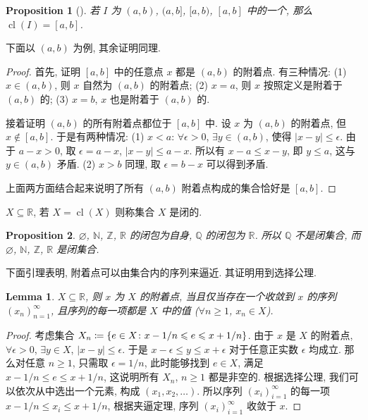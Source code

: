 \documentclass[UTF8]{ctexart}
\theoremstyle{mystyle}
\newtheorem{lemma}{Lemma}[section]
\newtheorem{proposition}{Proposition}[section]
\theoremstyle{myremark}
\theoremstyle{plain}
\newcommand{\R}{\mathbb R}
\newcommand{\Z}{\mathbb Z}
\newcommand{\N}{\mathbb N}
\newcommand{\Q}{\mathbb Q}
\DeclarePairedDelimiter\set{\{}{\}}
\DeclareMathOperator{\cl}{cl}
\begin{document}
\begin{proposition}[]
    若 $ I $ 为 $ (a, b) $, $ (a, b] $, $ [a, b) $, $ [a, b] $ 中的一个, 那么 $ \cl (I) = [a, b] $.
\end{proposition}

下面以 $ (a, b) $ 为例, 其余证明同理.
\begin{proof}
    首先, 证明 $ [a, b] $ 中的任意点 $ x $ 都是 $ (a, b) $ 的附着点. 有三种情况: (1) $ x \in (a, b) $, 则 $ x $ 自然为 $ (a, b) $ 的附着点; (2) $ x = a $, 则 $ x $ 按照定义是附着于 $ (a, b) $ 的; (3) $ x = b $, $ x $ 也是附着于 $ (a, b) $ 的.

    接着证明 $ (a, b) $ 的所有附着点都位于 $ [a, b] $ 中. 设 $ x $ 为 $ (a, b) $ 的附着点, 但 $ x \notin [a, b] $. 于是有两种情况: (1) $ x < a $: $ \forall \epsilon > 0 $, $ \exists y \in (a, b) $, 使得 $ |x - y| \leqslant \epsilon $. 由于 $ a - x > 0 $, 取 $ \epsilon = a - x $, $ |x - y| \leqslant a - x $. 所以有 $ x - a \leqslant x - y $, 即 $ y \leqslant a $, 这与 $ y \in (a, b) $ 矛盾. (2) $ x > b $ 同理, 取 $ \epsilon = b - x $ 可以得到矛盾.

    上面两方面结合起来说明了所有 $ (a, b) $ 附着点构成的集合恰好是 $ [a, b] $.
\end{proof}

\begin{definition}
    $ X \subseteq \R $, 若 $ X = \cl(X) $ 则称集合 $ X $ 是闭的.
\end{definition}

\begin{proposition}
    $ \varnothing $, $ \N $, $ \Z $, $ \R $ 的闭包为自身, $ \Q $ 的闭包为 $ \R $. 所以 $ \Q $ 不是闭集合, 而 $ \varnothing $, $ \N $, $ \Z $, $ \R $ 是闭集合.
\end{proposition}

下面引理表明, 附着点可以由集合内的序列来逼近. 其证明用到选择公理.
\begin{lemma}
    $ X \subseteq \R $, 则 $ x $ 为 $ X $ 的附着点, 当且仅当存在一个收敛到 $ x $ 的序列 $ (x_n)_{n = 1}^\infty $, 且序列的每一项都是 $ X $ 中的值 ($ \forall n \geqslant 1 $, $ x_n \in X $).
\end{lemma}

\begin{proof}
    考虑集合 $ X_n \coloneqq \set{e \in X \colon x - 1/n \leqslant e \leqslant x + 1/n} $. 由于 $ x $ 是 $ X $ 的附着点, $ \forall \epsilon > 0 $, $ \exists y \in X $, $ |x - y| \leqslant \epsilon $. 于是 $ x - \epsilon \leqslant y \leqslant x + \epsilon $ 对于任意正实数 $ \epsilon $ 均成立. 那么对任意 $ n \geqslant 1 $, 只需取 $ \epsilon = 1/n $, 此时能够找到 $ e \in X $, 满足 $ x - 1/n \leqslant e \leqslant x + 1/n $, 这说明所有 $ X_n $, $ n \geqslant 1 $ 都是非空的. 根据选择公理, 我们可以依次从中选出一个元素, 构成 $ (x_1, x_2, \dots) $. 所以序列 $ (x_i)_{i = 1}^\infty $ 的每一项 $ x - 1/n \leqslant x_i \leqslant x + 1/n $, 根据夹逼定理, 序列 $ (x_i)_{i = 1}^\infty $ 收敛于 $ x $.
\end{proof}
\end{document}
